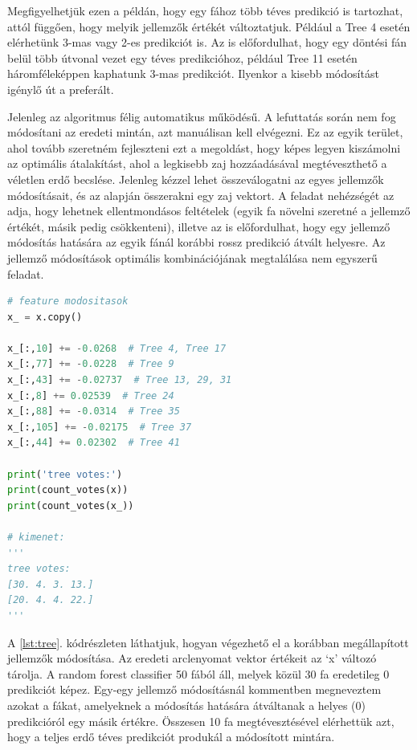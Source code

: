 Megfigyelhetjük ezen a példán, hogy egy fához több téves predikció is tartozhat, attól függően, hogy melyik jellemzők értékét változtatjuk. Például a Tree 4 esetén elérhetünk 3-mas vagy 2-es predikciót is. Az is előfordulhat, hogy egy döntési fán belül több útvonal vezet egy téves predikcióhoz, például Tree 11 esetén háromféleképpen kaphatunk 3-mas predikciót. Ilyenkor a kisebb módosítást igénylő út a preferált. 

Jelenleg az algoritmus félig automatikus működésű. A lefuttatás során nem fog módosítani az eredeti mintán, azt manuálisan kell elvégezni. Ez az egyik terület, ahol tovább szeretném fejleszteni ezt a megoldást, hogy képes legyen kiszámolni az optimális átalakítást, ahol a legkisebb zaj hozzáadásával megtéveszthető a véletlen erdő becslése. Jelenleg kézzel lehet összeválogatni az egyes jellemzők módosításait, és az alapján összerakni egy zaj vektort. A feladat nehézségét az adja, hogy lehetnek ellentmondásos feltételek (egyik fa növelni szeretné a jellemző értékét, másik pedig csökkenteni), illetve az is előfordulhat, hogy egy jellemző módosítás hatására az egyik fánál korábbi rossz predikció átvált helyesre. Az jellemző módosítások optimális kombinációjának megtalálása nem egyszerű feladat.

\begin{lstlisting}[language=python, caption={Korábbi elemzés alapján manuálisan elvégzett jellemző módosítások.}, label=lst:tree]
# feature modositasok
x_ = x.copy()

x_[:,10] += -0.0268  # Tree 4, Tree 17
x_[:,77] += -0.0228  # Tree 9
x_[:,43] += -0.02737  # Tree 13, 29, 31
x_[:,8] += 0.02539  # Tree 24
x_[:,88] += -0.0314  # Tree 35
x_[:,105] += -0.02175  # Tree 37
x_[:,44] += 0.02302  # Tree 41

print('tree votes:')
print(count_votes(x))
print(count_votes(x_))

# kimenet:
'''
tree votes:
[30. 4. 3. 13.]
[20. 4. 4. 22.]
'''
\end{lstlisting}

A \ref{lst:tree}. kódrészleten láthatjuk, hogyan végezhető el a korábban megállapított jellemzők módosítása. Az eredeti arclenyomat vektor értékeit az ‘x’ változó tárolja. A random forest classifier 50 fából áll, melyek közül 30 fa eredetileg 0 predikciót képez. Egy-egy jellemző módosításnál kommentben megneveztem azokat a fákat, amelyeknek a módosítás hatására átváltanak a helyes (0) predikcióról egy másik értékre. Összesen 10 fa megtévesztésével elérhettük azt, hogy a teljes erdő téves predikciót produkál a módosított mintára. 

